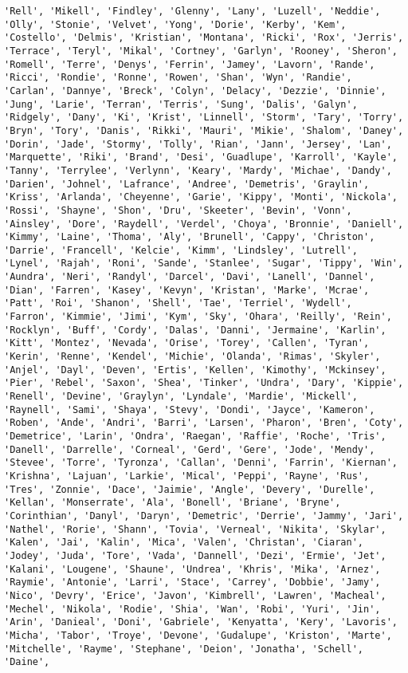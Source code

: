 \documentclass[11pt]{article}
\begin{document}
\begin{Verbatim}[commandchars=\\\{\}]
'Rell', 'Mikell', 'Findley', 'Glenny', 'Lany', 'Luzell', 'Neddie', 'Olly', 'Stonie', 'Velvet', 'Yong', 'Dorie', 'Kerby', 'Kem', 'Costello', 'Delmis', 'Kristian', 'Montana', 'Ricki', 'Rox', 'Jerris', 'Terrace', 'Teryl', 'Mikal', 'Cortney', 'Garlyn', 'Rooney', 'Sheron', 'Romell', 'Terre', 'Denys', 'Ferrin', 'Jamey', 'Lavorn', 'Rande', 'Ricci', 'Rondie', 'Ronne', 'Rowen', 'Shan', 'Wyn', 'Randie', 'Carlan', 'Dannye', 'Breck', 'Colyn', 'Delacy', 'Dezzie', 'Dinnie', 'Jung', 'Larie', 'Terran', 'Terris', 'Sung', 'Dalis', 'Galyn', 'Ridgely', 'Dany', 'Ki', 'Krist', 'Linnell', 'Storm', 'Tary', 'Torry', 'Bryn', 'Tory', 'Danis', 'Rikki', 'Mauri', 'Mikie', 'Shalom', 'Daney', 'Dorin', 'Jade', 'Stormy', 'Tolly', 'Rian', 'Jann', 'Jersey', 'Lan', 'Marquette', 'Riki', 'Brand', 'Desi', 'Guadlupe', 'Karroll', 'Kayle', 'Tanny', 'Terrylee', 'Verlynn', 'Keary', 'Mardy', 'Michae', 'Dandy', 'Darien', 'Johnel', 'Lafrance', 'Andree', 'Demetris', 'Graylin', 'Kriss', 'Arlanda', 'Cheyenne', 'Garie', 'Kippy', 'Monti', 'Nickola', 'Rossi', 'Shayne', 'Shon', 'Dru', 'Skeeter', 'Bevin', 'Vonn', 'Ainsley', 'Dore', 'Raydell', 'Verdel', 'Choya', 'Bronnie', 'Daniell', 'Kimmy', 'Laine', 'Thoma', 'Aly', 'Brunell', 'Cappy', 'Christon', 'Darrie', 'Francell', 'Kelcie', 'Kimm', 'Lindsley', 'Lutrell', 'Lynel', 'Rajah', 'Roni', 'Sande', 'Stanlee', 'Sugar', 'Tippy', 'Win', 'Aundra', 'Neri', 'Randyl', 'Darcel', 'Davi', 'Lanell', 'Dannel', 'Dian', 'Farren', 'Kasey', 'Kevyn', 'Kristan', 'Marke', 'Mcrae', 'Patt', 'Roi', 'Shanon', 'Shell', 'Tae', 'Terriel', 'Wydell', 'Farron', 'Kimmie', 'Jimi', 'Kym', 'Sky', 'Ohara', 'Reilly', 'Rein', 'Rocklyn', 'Buff', 'Cordy', 'Dalas', 'Danni', 'Jermaine', 'Karlin', 'Kitt', 'Montez', 'Nevada', 'Orise', 'Torey', 'Callen', 'Tyran', 'Kerin', 'Renne', 'Kendel', 'Michie', 'Olanda', 'Rimas', 'Skyler', 'Anjel', 'Dayl', 'Deven', 'Ertis', 'Kellen', 'Kimothy', 'Mckinsey', 'Pier', 'Rebel', 'Saxon', 'Shea', 'Tinker', 'Undra', 'Dary', 'Kippie', 'Renell', 'Devine', 'Graylyn', 'Lyndale', 'Mardie', 'Mickell', 'Raynell', 'Sami', 'Shaya', 'Stevy', 'Dondi', 'Jayce', 'Kameron', 'Roben', 'Ande', 'Andri', 'Barri', 'Larsen', 'Pharon', 'Bren', 'Coty', 'Demetrice', 'Larin', 'Ondra', 'Raegan', 'Raffie', 'Roche', 'Tris', 'Danell', 'Darrelle', 'Corneal', 'Gerd', 'Gere', 'Jode', 'Mendy', 'Stevee', 'Torre', 'Tyronza', 'Callan', 'Denni', 'Farrin', 'Kiernan', 'Krishna', 'Lajuan', 'Larkie', 'Mical', 'Peppi', 'Rayne', 'Rus', 'Tres', 'Zonnie', 'Dace', 'Jaimie', 'Angle', 'Devery', 'Durelle', 'Kellan', 'Monserrate', 'Ala', 'Bonell', 'Briane', 'Bryne', 'Corinthian', 'Danyl', 'Daryn', 'Demetric', 'Derrie', 'Jammy', 'Jari', 'Nathel', 'Rorie', 'Shann', 'Tovia', 'Verneal', 'Nikita', 'Skylar', 'Kalen', 'Jai', 'Kalin', 'Mica', 'Valen', 'Christan', 'Ciaran', 'Jodey', 'Juda', 'Tore', 'Vada', 'Dannell', 'Dezi', 'Ermie', 'Jet', 'Kalani', 'Lougene', 'Shaune', 'Undrea', 'Khris', 'Mika', 'Arnez', 'Raymie', 'Antonie', 'Larri', 'Stace', 'Carrey', 'Dobbie', 'Jamy', 'Nico', 'Devry', 'Erice', 'Javon', 'Kimbrell', 'Lawren', 'Macheal', 'Mechel', 'Nikola', 'Rodie', 'Shia', 'Wan', 'Robi', 'Yuri', 'Jin', 'Arin', 'Danieal', 'Doni', 'Gabriele', 'Kenyatta', 'Kery', 'Lavoris', 'Micha', 'Tabor', 'Troye', 'Devone', 'Gudalupe', 'Kriston', 'Marte', 'Mitchelle', 'Rayme', 'Stephane', 'Deion', 'Jonatha', 'Schell', 'Daine', 
\end{Verbatim}
\end{document}
